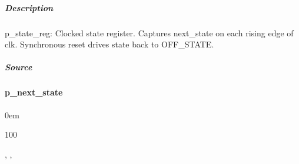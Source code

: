 \documentclass[letterpaper,10pt,english]{sphinxmanual}
\begin{document}
\subparagraph{Description}
\label{\detokenize{modules/blinky/processes/p_state_reg:description}}
\sphinxAtStartPar
p\_state\_reg: Clocked state register.
Captures next\_state on each rising edge of clk.
Synchronous reset drives state back to OFF\_STATE.

\noindent{}


\subparagraph{Source}
\label{\detokenize{modules/blinky/processes/p_state_reg:source}}
\begin{sphinxVerbatim}[commandchars=\\\{\}]
\end{sphinxVerbatim}

\sphinxstepscope


\paragraph{p\_next\_state}
\label{\detokenize{modules/blinky/processes/p_next_state:p-next-state}}\label{\detokenize{modules/blinky/processes/p_next_state::doc}}
\begin{DUlineblock}{0em}
\item[]  
\item[]  100
\item[]  
\item[]  , , 
\end{DUlineblock}
\end{document}
